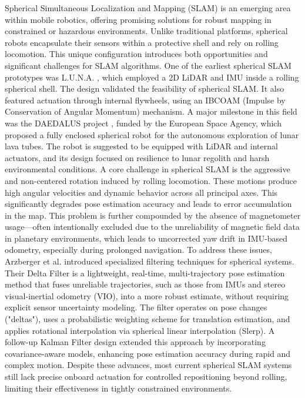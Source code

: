 \documentclass[conference]{IEEEtran}
\begin{document}
Spherical Simultaneous Localization and Mapping (SLAM) is an emerging area within mobile robotics, offering promising solutions for robust mapping in constrained or hazardous environments. 
Unlike traditional platforms, spherical robots encapsulate their sensors within a protective shell and rely on rolling locomotion. 
This unique configuration introduces both opportunities and significant challenges for SLAM algorithms. 
One of the earliest spherical SLAM prototypes was L.U.N.A. \cite{luna} , which employed a 2D LiDAR and IMU inside a rolling spherical shell. 
The design validated the feasibility of spherical SLAM. 
It also featured actuation through internal flywheels, using an IBCOAM (Impulse by Conservation of Angular Momentum) mechanism.
A major milestone in this field was the DAEDALUS project \cite{DAEDALUS}, funded by the European Space Agency, which proposed a fully enclosed spherical robot for the autonomous exploration of lunar lava tubes. 
The robot is suggested to be equipped with LiDAR and internal actuators, and its design focused on resilience to lunar regolith and harsh environmental conditions.
A core challenge in spherical SLAM is the aggressive and non-centered rotation induced by rolling locomotion. 
These motions produce high angular velocities and dynamic behavior across all principal axes. 
This significantly degrades pose estimation accuracy and leads to error accumulation in the map. 
This problem is further compounded by the absence of magnetometer usage—often intentionally excluded due to the unreliability of magnetic field data in planetary environments, which leads to uncorrected yaw drift in IMU-based odometry, especially during prolonged navigation.
To address these issues, Arzberger et al. \cite{Kalman_filter_sphere,sphere_Fabi_1,DeltaFilter} introduced specialized filtering techniques for spherical systems. 
Their Delta Filter is a lightweight, real-time, multi-trajectory pose estimation method that fuses unreliable trajectories, such as those from IMUs and stereo visual-inertial odometry (VIO), into a more robust estimate, without requiring explicit sensor uncertainty modeling. 
The filter operates on pose changes ("deltas"), uses a probabilistic weighting scheme for translation estimation, and applies rotational interpolation via spherical linear interpolation (Slerp). 
A follow-up Kalman Filter design extended this approach by incorporating covariance-aware models, enhancing pose estimation accuracy during rapid and complex motion.
Despite these advances, most current spherical SLAM systems still lack precise onboard actuation for controlled repositioning beyond rolling, limiting their effectiveness in tightly constrained environments. 
\end{document}
